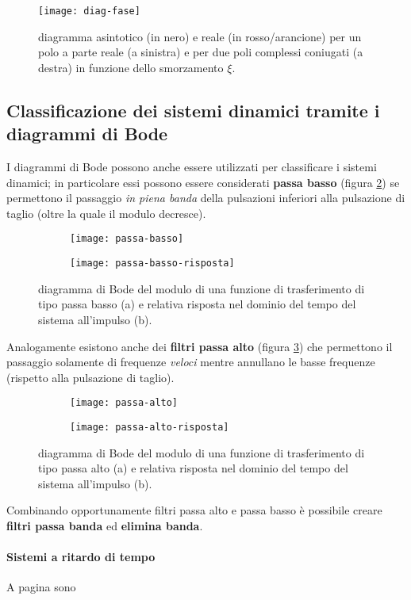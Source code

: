 		\begin{figure}[bht]
			\centering
			\texttt{[image: diag-fase]}
			\caption{diagramma asintotico (in nero) e reale (in rosso/arancione) per un polo a parte reale (a sinistra) e per due poli complessi coniugati (a destra) in funzione dello smorzamento $\xi$.}
			\label{fig:lti:fasebode}
		\end{figure}
	
	\subsection{Classificazione dei sistemi dinamici tramite i diagrammi di Bode}
		I diagrammi di Bode possono anche essere utilizzati per classificare i sistemi dinamici; in particolare essi possono essere considerati \textbf{passa basso} (figura \ref{fig:lti:passabasso}) se permettono il passaggio \textit{in piena banda} della pulsazioni inferiori alla pulsazione di taglio (oltre la quale il modulo decresce).
		
		\begin{figure}[bht]
			\centering
			\begin{subfigure}{0.48\linewidth}
				\centering 
				\texttt{[image: passa-basso]} \caption{}
			\end{subfigure}
			\begin{subfigure}{0.48\linewidth}
				\centering 
				\texttt{[image: passa-basso-risposta]} \caption{}
			\end{subfigure}
			\caption{diagramma di Bode del modulo di una funzione di trasferimento di tipo passa basso (a) e relativa risposta nel dominio del tempo del sistema all'impulso (b).}
			\label{fig:lti:passabasso}
		\end{figure}	
		
		Analogamente esistono anche dei \textbf{filtri passa alto} (figura \ref{fig:lti:passaalto}) che permettono il passaggio solamente di frequenze \textit{veloci} mentre annullano le basse frequenze (rispetto alla pulsazione di taglio).
		
		\begin{figure}[bht]
			\centering
			\begin{subfigure}{0.48\linewidth}
				\centering 
				\texttt{[image: passa-alto]} \caption{}
			\end{subfigure}
			\begin{subfigure}{0.48\linewidth}
				\centering 
				\texttt{[image: passa-alto-risposta]} \caption{}
			\end{subfigure}
			\caption{diagramma di Bode del modulo di una funzione di trasferimento di tipo passa alto (a) e relativa risposta nel dominio del tempo del sistema all'impulso (b).}
			\label{fig:lti:passaalto}
		\end{figure}	
		
		Combinando opportunamente filtri passa alto e passa basso è possibile creare \textbf{filtri passa banda} ed \textbf{elimina banda}.
		
		
		\paragraph{Sistemi a ritardo di tempo} A pagina \pageref{sec:ritardotempo} sono